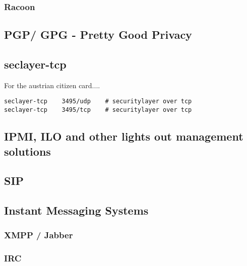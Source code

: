 \subsubsection{Racoon}


\subsection{PGP/ GPG - Pretty Good Privacy}



\subsection{seclayer-tcp}
For the austrian citizen card....

\begin{verbatim}
seclayer-tcp    3495/udp    # securitylayer over tcp
seclayer-tcp    3495/tcp    # securitylayer over tcp
\end{verbatim}


\subsection{IPMI, ILO and other lights out management solutions}

\subsection{SIP}

\subsection{Instant Messaging Systems}
\subsubsection{XMPP / Jabber}
\subsubsection{IRC}

